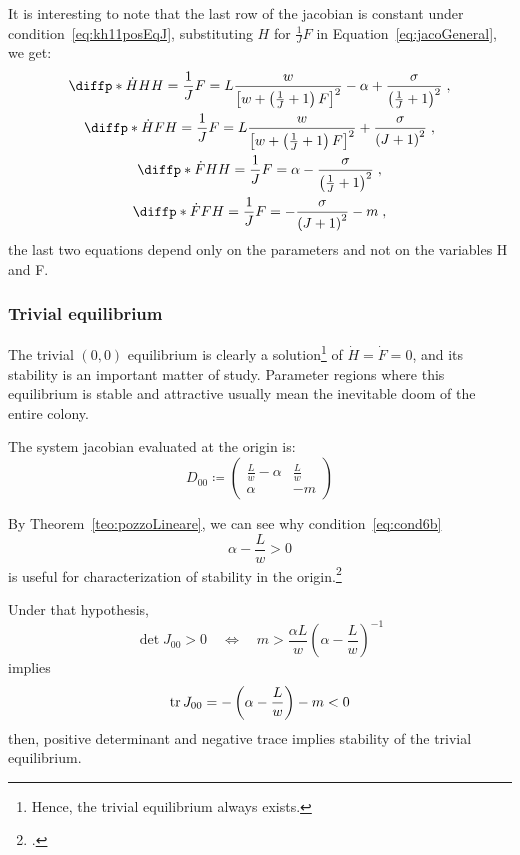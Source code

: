 It is interesting to note that the last row of the jacobian is constant under
condition~\eqref{eq:kh11posEqJ},
\ie substituting $H$ for $\frac{1}{J} F$ in Equation~\eqref{eq:jacoGeneral},
we get:
\begin{gather}
    \diffp*{ \dot{H} }{H}{H= \frac{1}{J} F} =
    L \frac{w}{ {\left[ w + \left( \frac{1}{J} +1 \right) F \right]}^2 } - \alpha
    + \frac{ \sigma }{ {\left( \frac{1}{J} + 1 \right)}^2 } \; ,
    \\
    \diffp*{ \dot{H} }{F}{H= \frac{1}{J} F} =
    L \frac{w}{ {\left[ w + \left( \frac{1}{J} +1 \right) F \right]}^2 }
    + \frac{ \sigma }{ {\left( J + 1 \right)}^2 } \; ,
    \\
    \diffp*{ \dot{F} }{H}{H= \frac{1}{J} F} =
    \alpha - \frac{ \sigma }{ {\left( \frac{1}{J} + 1 \right)}^2 } \; ,
    \\
    \diffp*{ \dot{F} }{F}{H= \frac{1}{J} F} =
    - \frac{ \sigma }{ {\left( J + 1 \right)}^2 } - m \; ,
    \label{eq:jacoOnJFH}
\end{gather}
the last two equations depend only on the parameters and not on the variables H and F.

\subsubsection{Trivial equilibrium}
The trivial $(0,0)$ equilibrium is clearly a solution\footnote{Hence, the trivial equilibrium always exists.}
of $\dot{H}=\dot{F}=0$, and its stability is an important matter of study. Parameter regions where this equilibrium is stable and attractive usually mean the inevitable doom of the entire colony.

The system jacobian evaluated at the origin is:
\begin{equation}
    D_{00} \coloneq
    \begin{pmatrix}
        \frac{L}{w} -\alpha &
        \frac{L}{w}
        \\
        \alpha & -m
    \end{pmatrix}
    \label{eq:jacoEquZero}
\end{equation}

By Theorem~\ref{teo:pozzoLineare}, we can see why
condition~\ref{eq:cond6b}
$$\alpha -\frac{L}{w}>0$$
is useful for characterization of stability in the origin.\footcite[3]{khoury2011}

Under that hypothesis,
$$\det  J_{00} > 0 \quad \iff \quad
m > \frac{\alpha L}{w} {\left( \alpha - \frac{L}{w} \right)}^{-1}$$
implies
$$\operatorname{tr} J_{00} = - \left( \alpha - \frac{L}{w} \right) - m < 0$$
then, positive determinant and negative trace implies stability of the trivial equilibrium.



